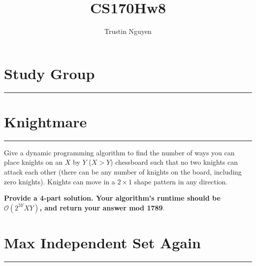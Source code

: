 \documentclass{article}
\title{CS170Hw8}
\author{Trustin Nguyen}
\begin{document}
    \maketitle

\reversemarginpar

\section*{Study Group}
\hrule

\section*{Knightmare}
\hrule

Give a dynamic programming algorithm to find the number of ways you can place knights on an $X$ by $Y$ ($X > Y$) chessboard such that no two knights can attack each other (there can be any number of knights on the board, including zero knights). Knights can move in a $2 \times 1$ shape pattern in any direction.

\textbf{Provide a 4-part solution. Your algorithm's runtime should be} $\mathcal{O}(2^{3Y}XY)$\textbf{, and return your answer mod 1789}.

\section*{Max Independent Set Again}
\hrule
\end{document}
